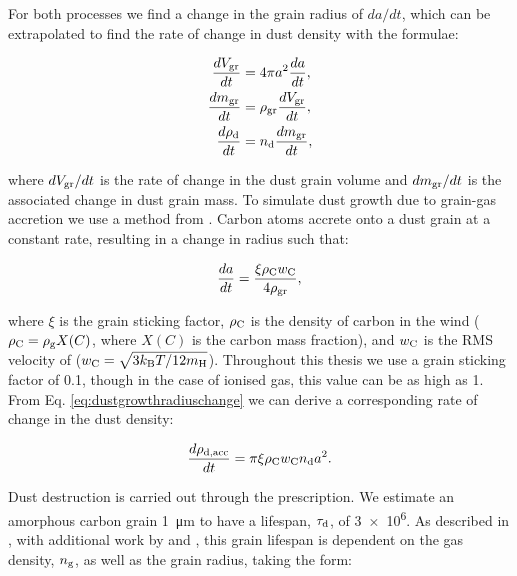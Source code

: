 For both processes we find a change in the grain radius of $da/dt$, which can be extrapolated to find the rate of change in dust density with the formulae:

\begin{subequations}
  \begin{align}
    \frac{dV_\text{gr}}{dt} & = 4 \pi a^2 \frac{da}{dt} ,\\
    \frac{dm_\text{gr}}{dt} & = \rho_\text{gr} \frac{dV_\text{gr}}{dt} ,\\
    \frac{d\rho_\text{d}}{dt}   & = n_\text{d} \frac{dm_\text{gr}}{dt} ,
  \end{align}
\end{subequations}

\noindent
where $dV_\text{gr}/dt$ is the rate of change in the dust grain volume and $dm_\text{gr}/dt$ is the associated change in dust grain mass.
To simulate dust growth due to grain-gas accretion we use a method from \textcite[Ch.~9]{spitzerPhysicalProcessesInterstellar2008}.
Carbon atoms accrete onto a dust grain at a constant rate, resulting in a change in radius such that:

\begin{equation}
  \label{eq:dustgrowthradiuschange}
  \frac{da}{dt} = \frac{\xi \rho_\text{C} w_\text{C}}{4\rho_\text{gr}} ,
\end{equation}

\noindent
where $\xi$ is the grain sticking factor, $\rho_\text{C}$ is the density of carbon in the wind ($\rho_\text{C} = \rho_\text{g} X(C)$, where $X(C)$ is the carbon mass fraction), and $w_\text{C}$ is the RMS velocity of ($w_\text{C} = \sqrt{3k_\text{B}T / 12 m_\text{H}}$).
Throughout this thesis we use a grain sticking factor of 0.1, though in the case of ionised gas, this value can be as high as 1.
From Eq. \ref{eq:dustgrowthradiuschange} we can derive a corresponding rate of change in the dust density:

\begin{equation}
  \frac{d \rho_\text{d,acc}}{dt} = \pi \xi \rho_\text{C} w_\text{C} n_\text{d} a^2.
\end{equation}

\noindent
Dust destruction is carried out through the \textcite{draineDestructionMechanismsInterstellar1979} prescription.
We estimate an amorphous carbon grain \SI{1}{\micro\metre} to have a lifespan, $\tau_\text{d}$, of \SI{3e6}{\year}.
As described in \textcite{draineDestructionMechanismsInterstellar1979}, with additional work by \textcite{tielens_physics_1994} and \textcite{dwekCoolingSputteringInfrared1996}, this grain lifespan is dependent on the gas density, $n_\text{g}$, as well as the grain radius, taking the form:

